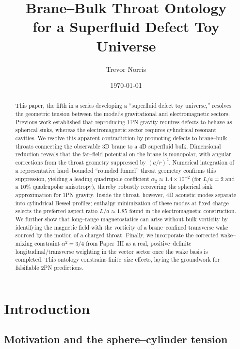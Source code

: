 \documentclass[12pt]{article}
\title{Brane--Bulk Throat Ontology\\ for a Superfluid Defect Toy Universe}
\author{Trevor Norris}
\date{\today}
\begin{document}
\maketitle

\begin{abstract}
This paper, the fifth in a series developing a ``superfluid defect toy universe,''
resolves the geometric tension between the model's gravitational and
electromagnetic sectors. Previous work established that reproducing 1PN
gravity requires defects to behave as spherical sinks, whereas the
electromagnetic sector requires cylindrical resonant cavities. We resolve
this apparent contradiction by promoting defects to brane--bulk throats
connecting the observable 3D brane to a 4D superfluid bulk. Dimensional
reduction reveals that the far--field potential on the brane is monopolar,
with angular corrections from the throat geometry suppressed by $(a/r)^2$.
Numerical integration of a representative hard--bounded ``rounded funnel'' throat geometry
confirms this suppression, yielding a leading quadrupole coefficient
$\alpha_2 \approx 1.4\times 10^{-2}$ (for $L/a=2$ and a $10\%$ quadrupolar anisotropy),
thereby robustly recovering the spherical sink approximation for 1PN gravity. Inside the
throat, however, 4D acoustic modes separate into cylindrical Bessel profiles;
enthalpy minimization of these modes at fixed charge selects the preferred
aspect ratio $L/a \approx 1.85$ found in the electromagnetic construction.
We further show that long--range magnetostatics can arise without bulk vorticity by identifying the magnetic field with the vorticity of a brane--confined transverse wake sourced by the motion of a charged throat. Finally, we incorporate the corrected wake--mixing constraint $\alpha^2 = 3/4$ from Paper~III as a real, positive--definite longitudinal/transverse weighting in the vector sector once the wake basis is completed.  This ontology constrains
finite--size effects, laying the groundwork for falsifiable 2PN predictions.
\end{abstract}

\section{Introduction}
\label{sec:intro}

\subsection{Motivation and the sphere--cylinder tension}
\label{subsec:intro_tension}
\end{document}
